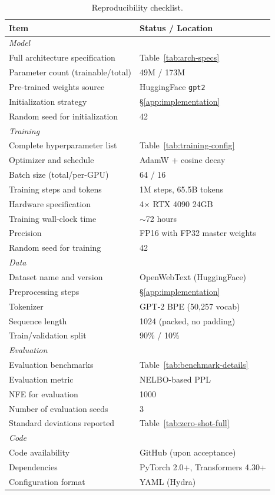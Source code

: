 \begin{table}[h]
\centering
\caption{Reproducibility checklist.}
\label{tab:reproducibility}
\begin{tabular}{p{8cm}l}
\toprule
\textbf{Item} & \textbf{Status / Location} \\
\midrule
\multicolumn{2}{l}{\textit{Model}} \\
Full architecture specification & Table~\ref{tab:arch-specs} \\
Parameter count (trainable/total) & 49M / 173M \\
Pre-trained weights source & HuggingFace \texttt{gpt2} \\
Initialization strategy & \S\ref{app:implementation} \\
Random seed for initialization & 42 \\
\midrule
\multicolumn{2}{l}{\textit{Training}} \\
Complete hyperparameter list & Table~\ref{tab:training-config} \\
Optimizer and schedule & AdamW + cosine decay \\
Batch size (total/per-GPU) & 64 / 16 \\
Training steps and tokens & 1M steps, 65.5B tokens \\
Hardware specification & 4$\times$ RTX 4090 24GB \\
Training wall-clock time & $\sim$72 hours \\
Precision & FP16 with FP32 master weights \\
Random seed for training & 42 \\
\midrule
\multicolumn{2}{l}{\textit{Data}} \\
Dataset name and version & OpenWebText (HuggingFace) \\
Preprocessing steps & \S\ref{app:implementation} \\
Tokenizer & GPT-2 BPE (50,257 vocab) \\
Sequence length & 1024 (packed, no padding) \\
Train/validation split & 90\% / 10\% \\
\midrule
\multicolumn{2}{l}{\textit{Evaluation}} \\
Evaluation benchmarks & Table~\ref{tab:benchmark-details} \\
Evaluation metric & NELBO-based PPL \\
NFE for evaluation & 1000 \\
Number of evaluation seeds & 3 \\
Standard deviations reported & Table~\ref{tab:zero-shot-full} \\
\midrule
\multicolumn{2}{l}{\textit{Code}} \\
Code availability & GitHub (upon acceptance) \\
Dependencies & PyTorch 2.0+, Transformers 4.30+ \\
Configuration format & YAML (Hydra) \\
\bottomrule
\end{tabular}
\end{table}

